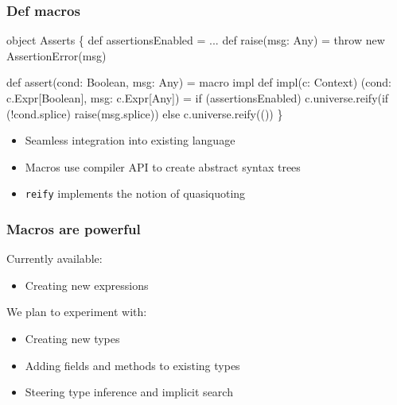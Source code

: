 \documentclass[svgnames,hyperref={bookmarks=false}]{beamer}
\begin{document}
\begin{frame}[fragile]
\frametitle{Def macros}
\begin{semiverbatim}
object Asserts \{
  def assertionsEnabled = ...
  def raise(msg: Any) = throw new AssertionError(msg)

  def assert(cond: Boolean, msg: Any) = macro impl
  def impl(c: Context)
          (cond: c.Expr[Boolean], msg: c.Expr[Any]) =
    if (assertionsEnabled)
      c.universe.reify(if (!cond.splice) raise(msg.splice))
    else
      c.universe.reify(())
\}
\end{semiverbatim}

\begin{itemize}
\item Seamless integration into existing language
\item Macros use compiler API to create abstract syntax trees
\item \texttt{reify} implements the notion of quasiquoting
\end{itemize}
\end{frame}

\begin{frame}[fragile]
\frametitle{Macros are powerful}

Currently available:
\begin{itemize}
\item Creating new expressions
\end{itemize}
\vskip25pt
We plan to experiment with:
\begin{itemize}
\item Creating new types
\item Adding fields and methods to existing types
\item Steering type inference and implicit search
\end{itemize}
\end{frame}
\end{document}
